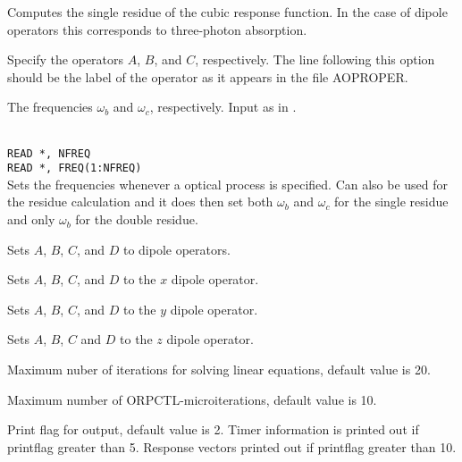\begin{description}

\item{}
Computes the single residue of the cubic
response function.
In the case of dipole operators this corresponds to
three-photon absorption.

\item[\Key{APROP}, \Key{BPROP}, \Key{CPROP}]
Specify the operators $A$, $B$, and $C$, respectively.
The line following this
option should be the label of the operator as it appears in the file
AOPROPER.

\item[\Key{BFREQ}, \Key{CFREQ}]
The frequencies
$\omega_b$ and $\omega_c$, respectively. Input as in
.

\item{}\\
\verb|READ *, NFREQ|\\
\verb|READ *, FREQ(1:NFREQ)|\\
Sets the frequencies whenever a optical process is specified.
Can also be used for the residue calculation and it does then set 
both $\omega_b$ and $\omega_c$ for the single residue and only
$\omega_b$ for the double residue.

\item{}
Sets $A$, $B$, $C$, and $D$ to dipole operators.

\item{}
Sets $A$, $B$, $C$, and $D$ to the $x$ dipole operator.

\item{}
Sets $A$, $B$, $C$, and $D$ to the $y$ dipole operator.

\item{}
Sets $A$, $B$, $C$ and $D$ to the $z$ dipole operator.

\item{}
Maximum nuber of iterations for solving linear equations, default value is 20.

\item{}
Maximum number of ORPCTL-microiterations, default value is 10.

\item{}
Print flag for output, default value is 2. Timer information is printed
out if printflag greater than 5. Response vectors printed out if
printflag greater than 10.


\end{description}
